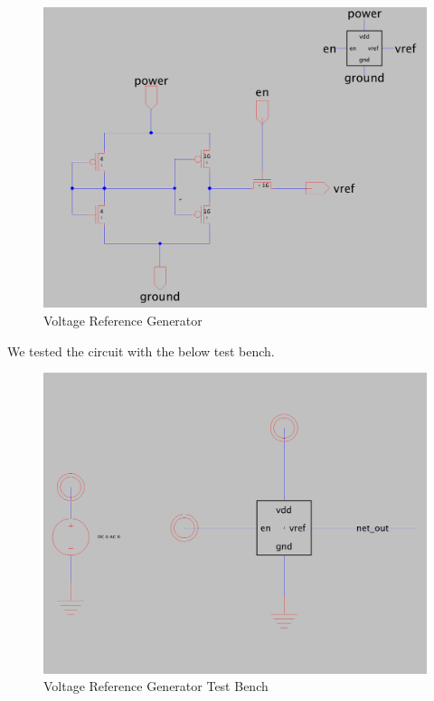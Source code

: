 \documentclass[a4paper]{article}
\begin{document}
\begin{figure}[H]
	\centering
	\includegraphics[scale=0.17]{vRefGen}
	\caption{Voltage Reference Generator}
	\label{fig:vRefGen}
\end{figure}

We tested the circuit with the below test bench.\\

\begin{figure}[H]
	\centering
	\includegraphics[scale=0.17]{vRefTest}
	\caption{Voltage Reference Generator Test Bench}
	\label{fig:vRefTest}
\end{figure}
\end{document}
